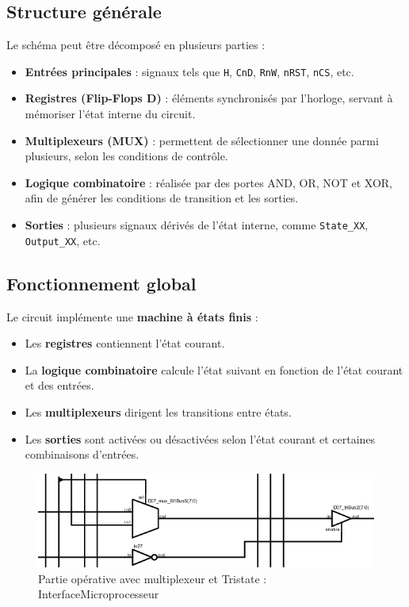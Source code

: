 \subsection*{Structure générale}
Le schéma peut être décomposé en plusieurs parties :
\begin{itemize}
    \item \textbf{Entrées principales} : signaux tels que 
    \texttt{H}, \texttt{CnD}, \texttt{RnW}, \texttt{nRST}, \texttt{nCS}, etc.
    \item \textbf{Registres (Flip-Flops D)} : éléments synchronisés par l’horloge, 
    servant à mémoriser l’état interne du circuit.
    \item \textbf{Multiplexeurs (MUX)} : permettent de sélectionner une donnée 
    parmi plusieurs, selon les conditions de contrôle.
    \item \textbf{Logique combinatoire} : réalisée par des portes AND, OR, NOT 
    et XOR, afin de générer les conditions de transition et les sorties.
    \item \textbf{Sorties} : plusieurs signaux dérivés de l’état interne, 
    comme \texttt{State\_XX}, \texttt{Output\_XX}, etc.
\end{itemize}

\subsection*{Fonctionnement global}
Le circuit implémente une \textbf{machine à états finis} :
\begin{itemize}
    \item Les \textbf{registres} contiennent l’état courant.
    \item La \textbf{logique combinatoire} calcule l’état suivant 
    en fonction de l’état courant et des entrées.
    \item Les \textbf{multiplexeurs} dirigent les transitions entre états.
    \item Les \textbf{sorties} sont activées ou désactivées selon l’état courant 
    et certaines combinaisons d’entrées.
\end{itemize}

\begin{figure}[H]
    \centering
    \includegraphics[width=0.9\linewidth]{images/Synthe/mux_tris.png}
    \caption{Partie opérative avec multiplexeur et Tristate : InterfaceMicroprocesseur}
    \label{fig:placeholder}
\end{figure}

